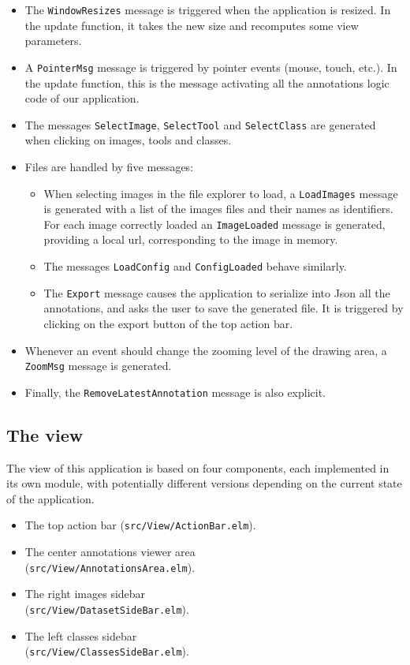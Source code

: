 \begin{itemize}
\item The \verb|WindowResizes| message is triggered when the application is resized.
	In the update function, it takes the new size and recomputes some view parameters.
\item A \verb|PointerMsg| message is triggered by pointer events (mouse, touch, etc.).
	In the update function, this is the message activating
	all the annotations logic code of our application.
\item The messages \verb|SelectImage|, \verb|SelectTool| and \verb|SelectClass|
	are generated when clicking on images, tools and classes.
\item Files are handled by five messages:
	\begin{itemize}
	\item When selecting images in the file explorer to load,
		a \verb|LoadImages| message is generated with a list of the images files
		and their names as identifiers.
		For each image correctly loaded an \verb|ImageLoaded| message is generated,
		providing a local url, corresponding to the image in memory.
    \item The messages \verb|LoadConfig| and \verb|ConfigLoaded| behave similarly.
    \item The \verb|Export| message causes the application to serialize into Json
		all the annotations, and asks the user to save the generated file.
		It is triggered by clicking on the export button of the top action bar.
	\end{itemize}
\item Whenever an event should change the zooming level of the drawing area,
	a \verb|ZoomMsg| message is  generated.
\item Finally, the \verb|RemoveLatestAnnotation| message is also explicit.
\end{itemize}


\subsection{The view}

The view of this application is based on four components,
each implemented in its own module, with potentially different versions
depending on the current state of the application.
\begin{itemize}
\item The top action bar (\verb|src/View/ActionBar.elm|).
\item The center annotations viewer area\\(\verb|src/View/AnnotationsArea.elm|).
\item The right images sidebar\\(\verb|src/View/DatasetSideBar.elm|).
\item The left classes sidebar\\(\verb|src/View/ClassesSideBar.elm|).
\end{itemize}


